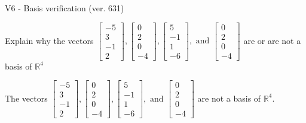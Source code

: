 \begin{exercise}
  \begin{exerciseTitle}V6 - Basis verification (ver. 631)\end{exerciseTitle}
  \begin{exerciseStatement}
    Explain why the vectors \(\left[\begin{array}{r}
-5 \\
3 \\
-1 \\
2
\end{array}\right] , \left[\begin{array}{r}
0 \\
2 \\
0 \\
-4
\end{array}\right] , \left[\begin{array}{r}
5 \\
-1 \\
1 \\
-6
\end{array}\right] , \text{ and } \left[\begin{array}{r}
0 \\
2 \\
0 \\
-4
\end{array}\right]\) are or are not a basis of \(\mathbb{R}^4\)	


  \end{exerciseStatement}
  \begin{exerciseAnswer}
   The vectors \(\left[\begin{array}{r}
-5 \\
3 \\
-1 \\
2
\end{array}\right] , \left[\begin{array}{r}
0 \\
2 \\
0 \\
-4
\end{array}\right] , \left[\begin{array}{r}
5 \\
-1 \\
1 \\
-6
\end{array}\right] , \text{ and } \left[\begin{array}{r}
0 \\
2 \\
0 \\
-4
\end{array}\right]\) 
  	 are not  a basis of \(\mathbb{R}^4\).
  


  \end{exerciseAnswer}
\end{exercise}